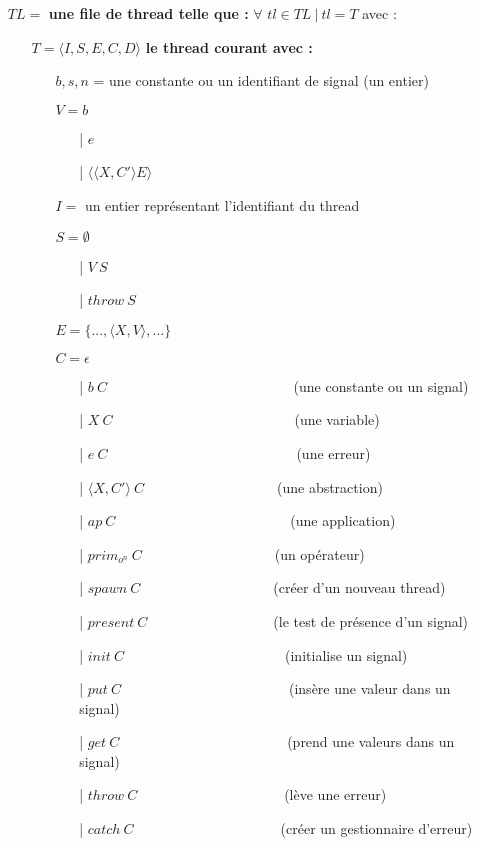 \documentclass[10pt,a4paper]{report}
\begin{document}
	\begin{itemize}
		\item[] $TL =$ \textbf{une file de thread telle que :} $\forall$ $tl \in TL~|~tl = T$ avec :
		\begin{itemize}
			\item[] $T = \langle I,S,E,C,D\rangle$ \textbf{le thread courant avec :}
			\begin{itemize}
				\item[] $b,s,n$ = une constante ou un identifiant de signal (un entier)
				\item[] $V = b$	
				\begin{itemize}
					\item[|] $e$
					\item[|] $\langle\langle X,C' \rangle E\rangle$
				\end{itemize}
				\item[] $I =$ un entier représentant l'identifiant du thread
				\item[] $S =  \emptyset$ 
				\begin{itemize}
					\item[|] $V~S$
					\item[|] $throw~S$
				\end{itemize}
				\item[] $E = \{...,\langle X,V\rangle,...\}$
				\item[] $C = \epsilon$
				\begin{itemize}
					\item[|] $b~C$~~~~~~~~~~~~~~~~~~~~~~~~~~ (une constante ou un signal)
					\item[|] $X~C$~~~~~~~~~~~~~~~~~~~~~~~~~~(une variable)
					\item[|] $e~C$~~~~~~~~~~~~~~~~~~~~~~~~~~~(une erreur)
					\item[|] $\langle X,C'\rangle~C$~~~~~~~~~~~~~~~~~~~(une abstraction)
					\item[|] $ap~C$~~~~~~~~~~~~~~~~~~~~~~~~~(une application)
					\item[|] $prim_{o^{n}}~C$~~~~~~~~~~~~~~~~~~~(un opérateur)
					\item[|] $spawn~C$~~~~~~~~~~~~~~~~~~~(créer d'un nouveau thread)
					\item[|] $present~C$~~~~~~~~~~~~~~~~~~(le test de présence d'un signal)
					\item[|] $init~C$~~~~~~~~~~~~~~~~~~~~~~~(initialise un signal)
					\item[|] $put~C$~~~~~~~~~~~~~~~~~~~~~~~~(insère une valeur dans un signal)
					\item[|] $get~C$~~~~~~~~~~~~~~~~~~~~~~~~(prend une valeurs dans un signal)
					\item[|] $throw~C$~~~~~~~~~~~~~~~~~~~~~(lève une erreur)
					\item[|] $catch~C$~~~~~~~~~~~~~~~~~~~~~(créer un gestionnaire d'erreur)
					

\end{itemize}
\end{itemize}
\end{itemize}
\end{itemize}
\end{document}
